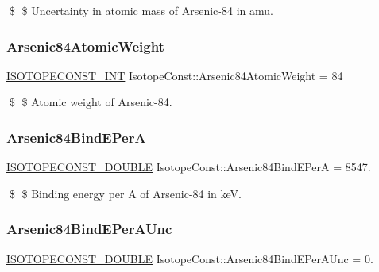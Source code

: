 \$ \$ Uncertainty in atomic mass of Arsenic-\/84 in amu. \mbox{\label{group___isotope_const-_arsenic-_as84_gaafa53192938b593b509604439ecf42c2}} 
\subsubsection{\texorpdfstring{Arsenic84\+Atomic\+Weight}{Arsenic84AtomicWeight}}
{\footnotesize\ttfamily \mbox{\hyperlink{group___isotope_const-_macros_ga5f18360b3e99483a35c32d789e62621c}{I\+S\+O\+T\+O\+P\+E\+C\+O\+N\+S\+T\+\_\+\+I\+NT}} Isotope\+Const\+::\+Arsenic84\+Atomic\+Weight = 84}

\$ \$ Atomic weight of Arsenic-\/84. \mbox{\label{group___isotope_const-_arsenic-_as84_ga3573c742d2c0679b55e3147ae4162d41}} 
\subsubsection{\texorpdfstring{Arsenic84\+Bind\+E\+PerA}{Arsenic84BindEPerA}}
{\footnotesize\ttfamily \mbox{\hyperlink{group___isotope_const-_macros_ga8f45a7272ce02c0b4c65c44636ed719a}{I\+S\+O\+T\+O\+P\+E\+C\+O\+N\+S\+T\+\_\+\+D\+O\+U\+B\+LE}} Isotope\+Const\+::\+Arsenic84\+Bind\+E\+PerA = 8547.}

\$ \$ Binding energy per A of Arsenic-\/84 in keV. \mbox{\label{group___isotope_const-_arsenic-_as84_ga94442c0614554c5d43f026a892ccb92a}} 
\subsubsection{\texorpdfstring{Arsenic84\+Bind\+E\+Per\+A\+Unc}{Arsenic84BindEPerAUnc}}
{\footnotesize\ttfamily \mbox{\hyperlink{group___isotope_const-_macros_ga8f45a7272ce02c0b4c65c44636ed719a}{I\+S\+O\+T\+O\+P\+E\+C\+O\+N\+S\+T\+\_\+\+D\+O\+U\+B\+LE}} Isotope\+Const\+::\+Arsenic84\+Bind\+E\+Per\+A\+Unc = 0.}

